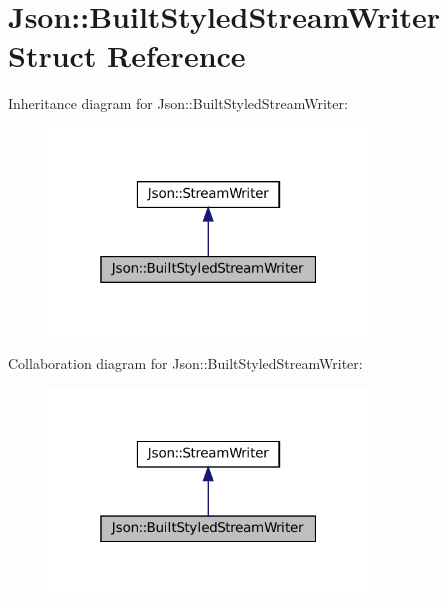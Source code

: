 \hypertarget{structJson_1_1BuiltStyledStreamWriter}{}\section{Json\+:\+:Built\+Styled\+Stream\+Writer Struct Reference}
\label{structJson_1_1BuiltStyledStreamWriter}


Inheritance diagram for Json\+:\+:Built\+Styled\+Stream\+Writer\+:
\nopagebreak
\begin{figure}[H]
\begin{center}
\leavevmode
\includegraphics[width=241pt]{structJson_1_1BuiltStyledStreamWriter__inherit__graph}
\end{center}
\end{figure}


Collaboration diagram for Json\+:\+:Built\+Styled\+Stream\+Writer\+:
\nopagebreak
\begin{figure}[H]
\begin{center}
\leavevmode
\includegraphics[width=241pt]{structJson_1_1BuiltStyledStreamWriter__coll__graph}
\end{center}
\end{figure}
